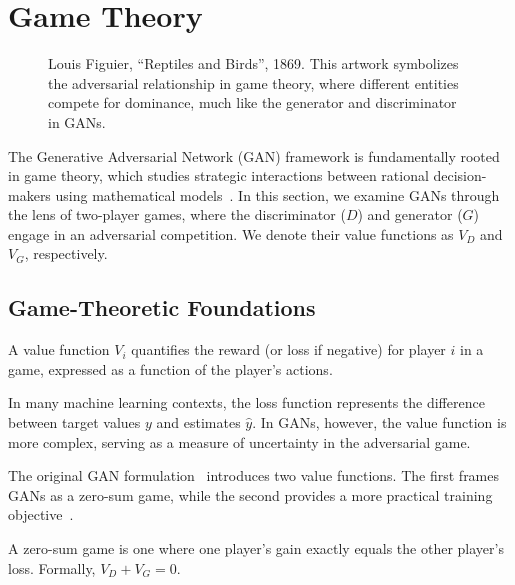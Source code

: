 \section{Game Theory}%
\label{sec:game-theory}
\vspace{0.5cm}
\begin{figure}[h!]%
  \label{fig:paradise-2}
  \centering
  \caption{Louis Figuier, ``Reptiles and Birds'', 1869. This artwork symbolizes the adversarial relationship in game theory, where different entities compete for dominance, much like the generator and discriminator in GANs.}
\end{figure}
\vspace{0.5cm}

The Generative Adversarial Network (GAN) framework is fundamentally rooted in game theory, which studies strategic interactions between rational decision-makers using mathematical models~\cite{ref:myerson}. In this section, we examine GANs through the lens of two-player games, where the discriminator ($D$) and generator ($G$) engage in an adversarial competition. We denote their value functions as $V_D$ and $V_G$, respectively.

\subsection{Game-Theoretic Foundations}

\begin{definition}%
  \label{def:value-function}
  A \textnormal{\sffamily value function} $V_i$ quantifies the reward (or loss if negative) for player $i$ in a game, expressed as a function of the player's actions.
\end{definition}

\begin{remark}
  In many machine learning contexts, the loss function represents the difference between target values $y$ and estimates $\hat{y}$. In GANs, however, the value function is more complex, serving as a measure of uncertainty in the adversarial game.
\end{remark}

The original GAN formulation~\cite{ref:goodfellow-original} introduces two value functions. The first frames GANs as a zero-sum game, while the second provides a more practical training objective~\cite{ref:gidel-variational-2018}.

\begin{definition}%
  \label{def:zero-sum-game}
  A \textnormal{\sffamily zero-sum game} is one where one player's gain exactly equals the other player's loss. Formally, $V_D + V_G = 0$.
\end{definition}

